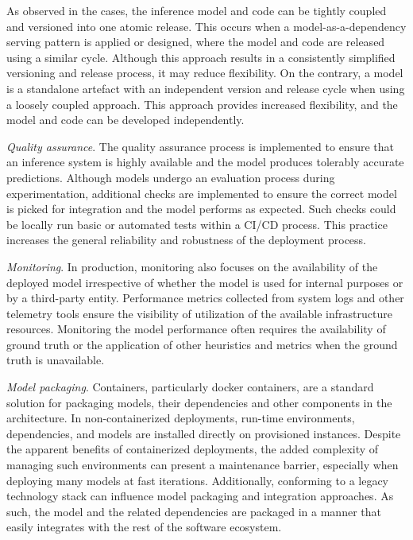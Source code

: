 As observed in the cases, the inference model and code can be tightly coupled and versioned into one atomic release. This occurs when a model-as-a-dependency serving pattern is applied or designed, where the model and code are released using a similar cycle. Although this approach results in a consistently simplified versioning and release process, it may reduce flexibility. On the contrary, a model is a standalone artefact with an independent version and release cycle when using a loosely coupled approach. This approach provides increased flexibility, and the model and code can be developed independently.

\textit{Quality assurance}. The quality assurance process is implemented to ensure that an inference system is highly available and the model produces tolerably accurate predictions. Although models undergo an evaluation process during experimentation, additional checks are implemented to ensure the correct model is picked for integration and the model performs as expected. Such checks could be locally run basic or automated tests within a CI/CD process. This practice increases the general reliability and robustness of the deployment process.

\textit{Monitoring}. In production, monitoring also focuses on the availability of the deployed model irrespective of whether the model is used for internal purposes or by a third-party entity. Performance metrics collected from system logs and other telemetry tools ensure the visibility of utilization of the available infrastructure resources. Monitoring the model performance often requires the availability of ground truth or the application of other heuristics and metrics when the ground truth is unavailable.

\textit{Model packaging}. Containers, particularly docker containers, are a standard solution for packaging models, their dependencies and other components in the architecture. In non-containerized deployments, run-time environments, dependencies, and models are installed directly on provisioned instances. Despite the apparent benefits of containerized deployments, the added complexity of managing such environments can present a maintenance barrier, especially when deploying many models at fast iterations. Additionally, conforming to a legacy technology stack can influence model packaging and integration approaches. As such, the model and the related dependencies are packaged in a manner that easily integrates with the rest of the software ecosystem.

